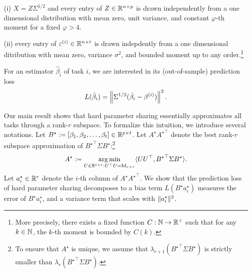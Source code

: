 \vspace{-0.05in}
(i) $X = Z \Sigma^{1/2}$ and every entry of $Z \in \mathbb{R}^{n \times p}$ is drawn independently from a one dimensional distribution with mean zero, unit variance, and constant $\varphi$-th moment for a fixed $\varphi > 4$.

\vspace{-0.05in}
(ii) every entry of $\varepsilon^{(i)} \in \mathbb{R}^{n \times t}$ is drawn indepdently from a one dimensional ditribution with mean zero, variance $\sigma^2$, and bounded moment up to any order.\footnote{More precisely, there exists a fixed function $C: \mathbb{N} \rightarrow \mathbb{R}^+$ such that for any $k \in \mathbb{N}$, the $k$-th moment is bounded by $C(k)$.}

For an estimator $\hat{\beta}_i$ of task $i$, we are interested in its (out-of-sample) prediction loss
\[ L(\hat{\beta}_i) = \left\| \Sigma^{1/2} (\hat{\beta_i} - \beta^{(i)}) \right\|^2. \]

Our main result shows that hard parameter sharing essentially approximates all tasks through a rank-$r$ subspace.
To formalize this intuition, we introduce several notations.
Let $B^\star := [{\beta}_1,{\beta}_2,\dots,{\beta}_{t}] \in \mathbb{R}^{p\times t}$.
Let $A^{\star} {A^{\star}}^{\top}$ denote the best rank-$r$ subspace approximation of ${B^{\star}}^\top\Sigma B^{\star}$:\footnote{To ensure that $A^{\star}$ is unique, we assume that $\lambda_{r+1}({B^\star}^\top \Sigma B^\star)$ is strictly smaller than $\lambda_{r}({B^\star}^\top \Sigma B^\star)$.}
\[ A^{\star} := \operatorname*{arg\,min}_{U\in\mathbb{R}^{t\times r} : U^{\top} U = \operatorname{Id}_{r\times r}} \langle U U^{\top}, {B^{\star}}^{\top} \Sigma B^{\star} \rangle. \]
Let $a_i^{\star} \in\mathbb{R}^r$ denote the $i$-th column of $A^{\star}{A^{\star}}^{\top}$.
We show that the prediction loss of hard parameter sharing decomposes to a bias term $L(B^{\star} a_i^{\star})$ measures the error of $B^{\star} a_i^{\star}$, and a variance term that scales with $\|a_i^{\star}\|^2$.


